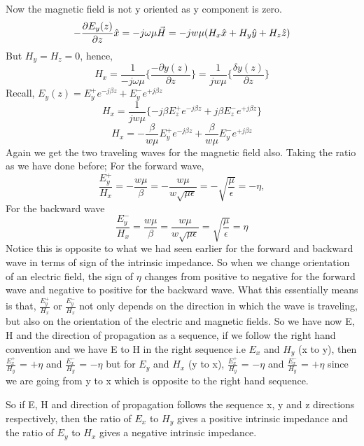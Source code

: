 Now the magnetic field is not y oriented as y component is zero.
\begin{dmath*}
-\pdv{E_y(z)}{z}\hat{x} = -j\omega\mu\vec{H} = -jw\mu (H_x\hat{x} + H_y\hat{y} + H_z\hat{z}) 
\end{dmath*}
But	$H_y = H_z = 0$, hence,
\begin{dmath*}
H_x = \frac{1}{-j\omega\mu}\{\frac{-\partial y(z)}{\partial z}\} = \frac{1}{jw\mu}\{\frac{\delta y(z)}{\partial z}\}
\end{dmath*} 
Recall,
$E_y(z) = E_y^+ e^{-j\beta z} + E_y^- e^{+j\beta z}$
\begin{dmath*}
H_x= \frac{1}{jw\mu} \{-j\beta E_z^+e^{-j\beta z} + j\beta E_z^-e^{+j\beta z} \}
\end{dmath*}
\begin{dmath*}
H_x = - \frac{\beta}{w\mu} E_y^+e^{-j\beta z} +\frac{\beta}{w\mu}E_y^-e^{+j\beta z}
\end{dmath*}
Again we get the two traveling waves for the magnetic field also. Taking the ratio as we have done before; 
For the forward wave,
\begin{dmath*}
\frac{E_y^+}{H_x} = -\frac{w\mu}{\beta} = -\frac{w\mu}{w\sqrt{\mu \epsilon}} = -\sqrt{\frac{\mu}{\epsilon}} = -\eta,
\end{dmath*}
For the backward wave
\begin{dmath*}
\frac{E_y^-}{H_x} = \frac{w\mu}{\beta} = \frac{w\mu}{w\sqrt{\mu \epsilon}} = \sqrt{\frac{\mu}{\epsilon}} = \eta
\end{dmath*}
Notice this is opposite to what we had seen earlier for the forward and backward wave in terms of sign of the intrinsic impedance. So when we change orientation of an electric field, the sign of $\eta$ changes from positive to negative for the forward wave and negative to positive for the backward wave. What this essentially means is that, $\frac{E_y^+}{H_x}$ or $\frac{E_y^-}{H_x}$ not only depends on the direction in which the wave is traveling, but also on the orientation of the electric and magnetic fields. So we have now E, H and the direction of propagation as a sequence, if we follow the right hand convention and we have E to H in the right sequence i.e $E_x$ and $H_y$ (x to y), then $\frac{E_x^+}{H_y}$ = $+\eta$ and $\frac{E_x^-}{H_y}$ = $-\eta$ but for $E_y$ and $H_x$ (y to x), $\frac{E_x^+}{H_y}$ = $-\eta$ and $\frac{E_x^-}{H_y}$ = $+\eta$ since we are going from y to x which is opposite to the right hand sequence.

So if E, H and direction of propagation follows the sequence x, y and z directions respectively, then the ratio of $E_x$ to $H_y$ gives a positive intrinsic impedance and the ratio of $E_y$ to $H_x$ gives a negative intrinsic impedance. 

